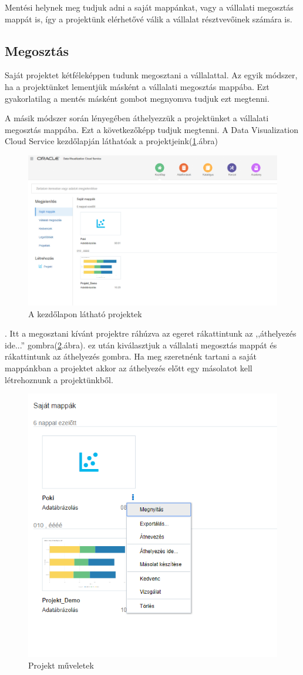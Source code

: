 Mentési helynek meg tudjuk adni a saját mappánkat, vagy a vállalati megosztás mappát is, így a projektünk elérhetővé válik a vállalat résztvevőinek számára is.

\pagebreak

\subsection{Megosztás}
Saját projektet kétféleképpen tudunk megosztani a vállalattal. Az egyik módszer, ha a projektünket lementjük másként a vállalati megosztás mappába. Ezt gyakorlatilag a mentés másként gombot megnyomva tudjuk ezt megtenni.

A másik módszer során lényegében áthelyezzük a projektünket a vállalati megosztás mappába. Ezt a következőképp tudjuk megtenni. A Data Visualization Cloud Service kezdőlapján láthatóak a projektjeink(\ref{fig:kezdolap}.ábra)
\begin{figure}[!h]
	\centering
	\includegraphics[width=0.7\linewidth]{matyi_imgs/kezdolap}
	\caption[A kezdőlapon látható projektek]{A kezdőlapon látható projektek}
	\label{fig:kezdolap}
\end{figure}
. Itt a megosztani kívánt projektre ráhúzva az egeret rákattintunk az ,,áthelyezés ide...'' gombra(\ref{fig:athelyezes}.ábra). 
ez után kiválasztjuk a vállalati megosztás mappát és rákattintunk az áthelyezés gombra. Ha meg szeretnénk tartani a saját mappánkban a projektet akkor az áthelyezés előtt egy másolatot kell létrehoznunk a projektünkből. 
 
\begin{figure}[!h]
	\centering
	\includegraphics[width=0.6\linewidth]{matyi_imgs/athelyezes}
	\caption[Projekt műveletek]{Projekt műveletek}
	\label{fig:athelyezes}
\end{figure}

